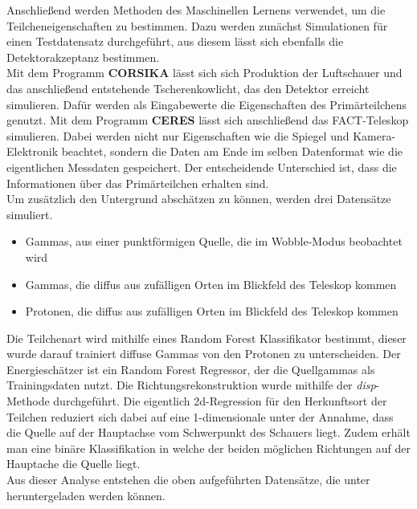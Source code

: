 Anschließend werden Methoden des Maschinellen Lernens verwendet, um die Teilcheneigenschaften zu bestimmen. Dazu werden zunächst Simulationen für einen Testdatensatz durchgeführt, aus diesem lässt sich ebenfalls die Detektorakzeptanz bestimmen. \\
Mit dem Programm \textbf{CORSIKA} \cite{1998cmcc.book.....H} lässt sich sich Produktion der Luftschauer und das anschließend entstehende Tscherenkowlicht, das den Detektor erreicht simulieren. Dafür werden als Eingabewerte die Eigenschaften des Primärteilchens genutzt. Mit dem Programm \textbf{CERES} lässt sich anschließend das FACT-Teleskop simulieren. Dabei werden nicht nur Eigenschaften wie die Spiegel und Kamera-Elektronik beachtet, sondern die Daten am Ende im selben Datenformat wie die eigentlichen Messdaten gespeichert. Der entscheidende Unterschied ist, dass die Informationen über das Primärteilchen erhalten sind.\\
Um zusätzlich den Untergrund abschätzen zu können, werden drei Datensätze simuliert.
\begin{itemize}
	\item Gammas, aus einer punktförmigen Quelle, die im Wobble-Modus beobachtet wird
	\item Gammas, die diffus aus zufälligen Orten im Blickfeld des Teleskop kommen
	\item Protonen, die diffus aus zufälligen Orten im Blickfeld des Teleskop kommen
\end{itemize}
Die Teilchenart wird mithilfe eines Random Forest Klassifikator bestimmt, dieser wurde darauf trainiert diffuse Gammas von den Protonen zu unterscheiden. Der Energieschätzer ist ein Random Forest Regressor, der die Quellgammas als Trainingsdaten nutzt. Die Richtungsrekonstruktion wurde mithilfe der \textit{disp}-Methode durchgeführt. Die eigentlich 2d-Regression für den Herkunftsort der Teilchen reduziert sich dabei auf eine 1-dimensionale unter der Annahme, dass die Quelle auf der Hauptachse vom Schwerpunkt des Schauers liegt. Zudem erhält man eine binäre Klassifikation in welche der beiden möglichen Richtungen auf der Hauptache die Quelle liegt.\\
Aus dieser Analyse entstehen die oben aufgeführten Datensätze, die unter \cite{FACTdata} heruntergeladen werden können.

